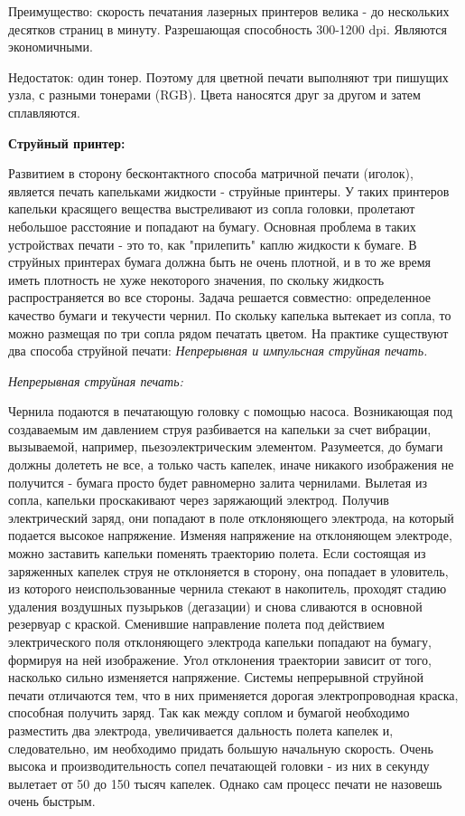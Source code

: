 \documentclass[unicode, 12pt, a4paper, oneside]{article}
\begin{document}
Преимущество: скорость печатания лазерных принтеров велика - до нескольких десятков страниц в минуту. Разрешающая способность 300-1200 dpi. Являются экономичными.

Недостаток: один тонер. Поэтому для цветной печати выполняют три пишущих узла, с разными тонерами (RGB). Цвета наносятся друг за другом  и затем сплавляются. 

{\bf Струйный принтер:}

Развитием в сторону бесконтактного способа матричной печати (иголок), является печать капельками жидкости - струйные принтеры. У таких принтеров капельки красящего вещества выстреливают из сопла головки, пролетают небольшое расстояние и попадают на бумагу. Основная проблема в таких устройствах печати - это то, как "прилепить" каплю жидкости к бумаге. В струйных принтерах бумага должна быть не очень плотной, и в то же время иметь плотность не хуже некоторого значения, по скольку жидкость распространяется во все стороны. Задача решается совместно: определенное качество бумаги и текучести чернил. По скольку капелька вытекает из сопла, то можно размещая по три сопла рядом печатать цветом. На практике существуют два способа струйной печати: {\sl Непрерывная и импульсная струйная печать.}

{\it Непрерывная струйная  печать:}

Чернила подаются в печатающую головку с помощью насоса. Возникающая под создаваемым им давлением струя разбивается на капельки за счет вибрации, вызываемой, например, пьезоэлектрическим элементом. Разумеется, до бумаги должны долететь не все, а только часть капелек, иначе никакого изображения не получится - бумага просто будет равномерно залита чернилами.
Вылетая из сопла, капельки проскакивают через заряжающий электрод. Получив электрический заряд, они попадают в поле отклоняющего электрода, на который подается высокое напряжение. Изменяя напряжение на отклоняющем электроде, можно заставить капельки поменять траекторию полета. Если состоящая из заряженных капелек струя не отклоняется в сторону, она попадает в уловитель, из которого неиспользованные чернила стекают в накопитель, проходят стадию удаления воздушных пузырьков (дегазации) и снова сливаются в основной резервуар с краской.
Сменившие направление полета под действием электрического поля отклоняющего электрода капельки попадают на бумагу, формируя на ней изображение. Угол отклонения траектории зависит от того, насколько сильно изменяется напряжение.
Системы непрерывной струйной печати отличаются тем, что в них применяется дорогая электропроводная краска, способная получить заряд. Так как между соплом и бумагой необходимо разместить два электрода, увеличивается дальность полета капелек и, следовательно, им необходимо придать большую начальную скорость. Очень высока и производительность сопел печатающей головки - из них в секунду вылетает от 50 до 150 тысяч капелек. Однако сам процесс печати не назовешь очень быстрым.
\end{document}

